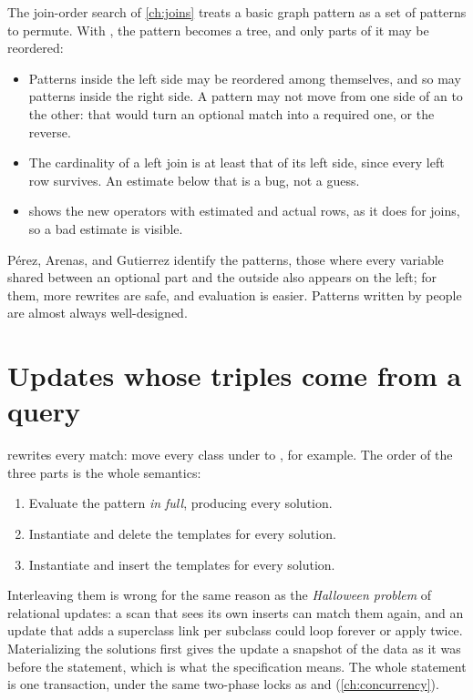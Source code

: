 The join-order search of \cref{ch:joins} treats a basic graph pattern as a set
of patterns to permute. With , the pattern becomes a tree, and
only parts of it may be reordered:
\begin{itemize}
\item Patterns inside the left side may be reordered among themselves, and so
may patterns inside the right side. A pattern may not move from one side of an
 to the other: that would turn an optional match into a required
one, or the reverse.
\item The cardinality of a left join is at least that of its left side, since
every left row survives. An estimate below that is a bug, not a guess.
\item {} shows the new operators with
estimated and actual rows, as it does for joins, so a bad estimate is visible.
\end{itemize}
Pérez, Arenas, and Gutierrez \cite{perez2009} identify the 
patterns, those where every variable shared between an optional part and the
outside also appears on the left; for them, more rewrites are safe, and
evaluation is easier. Patterns written by people are almost always
well-designed.

\section{Updates whose triples come from a query}

 rewrites every
match: move every class under  to ,
for example. The order of the three parts is the whole semantics:

\begin{enumerate}
\item Evaluate the  pattern \emph{in full}, producing every solution.
\item Instantiate and delete the  templates for every solution.
\item Instantiate and insert the  templates for every solution.
\end{enumerate}

Interleaving them is wrong for the same reason as the \emph{Halloween problem}
of relational updates: a scan that sees its own inserts can match them again,
and an update that adds a superclass link per subclass could loop forever or
apply twice. Materializing the solutions first gives the update a snapshot of
the data as it was before the statement, which is what the specification
means. The whole statement is one transaction, under the same two-phase locks
as  and  (\cref{ch:concurrency}).

